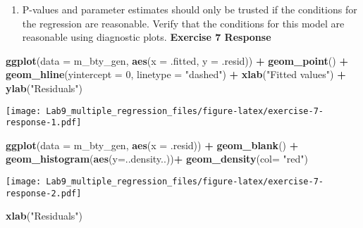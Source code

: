 \documentclass[
]{article}
\newenvironment{Shaded}{\begin{snugshade}}{\end{snugshade}}
\newcommand{\AttributeTok}[1]{\textcolor[rgb]{0.13,0.29,0.53}{#1}}
\newcommand{\DecValTok}[1]{\textcolor[rgb]{0.00,0.00,0.81}{#1}}
\newcommand{\FunctionTok}[1]{\textcolor[rgb]{0.13,0.29,0.53}{\textbf{#1}}}
\newcommand{\NormalTok}[1]{#1}
\newcommand{\SpecialCharTok}[1]{\textcolor[rgb]{0.81,0.36,0.00}{\textbf{#1}}}
\newcommand{\StringTok}[1]{\textcolor[rgb]{0.31,0.60,0.02}{#1}}
\providecommand{\tightlist}{%
  \setlength{\itemsep}{0pt}\setlength{\parskip}{0pt}}
\begin{document}
\begin{enumerate}
\def\labelenumi{\arabic{enumi}.}
\setcounter{enumi}{6}
\tightlist
\item
  P-values and parameter estimates should only be trusted if the
  conditions for the regression are reasonable. Verify that the
  conditions for this model are reasonable using diagnostic plots.
  \textbf{Exercise 7 Response}
\end{enumerate}

\begin{Shaded}
\begin{Highlighting}[]
\FunctionTok{ggplot}\NormalTok{(}\AttributeTok{data =}\NormalTok{ m\_bty\_gen, }\FunctionTok{aes}\NormalTok{(}\AttributeTok{x =}\NormalTok{ .fitted, }\AttributeTok{y =}\NormalTok{ .resid)) }\SpecialCharTok{+}
  \FunctionTok{geom\_point}\NormalTok{() }\SpecialCharTok{+}
  \FunctionTok{geom\_hline}\NormalTok{(}\AttributeTok{yintercept =} \DecValTok{0}\NormalTok{, }\AttributeTok{linetype =} \StringTok{"dashed"}\NormalTok{) }\SpecialCharTok{+}
  \FunctionTok{xlab}\NormalTok{(}\StringTok{"Fitted values"}\NormalTok{) }\SpecialCharTok{+}
  \FunctionTok{ylab}\NormalTok{(}\StringTok{"Residuals"}\NormalTok{)}
\end{Highlighting}
\end{Shaded}

\texttt{[image: Lab9\_multiple\_regression\_files/figure-latex/exercise-7-response-1.pdf]}

\begin{Shaded}
\begin{Highlighting}[]
\FunctionTok{ggplot}\NormalTok{(}\AttributeTok{data =}\NormalTok{ m\_bty\_gen, }\FunctionTok{aes}\NormalTok{(}\AttributeTok{x =}\NormalTok{ .resid)) }\SpecialCharTok{+}
  \FunctionTok{geom\_blank}\NormalTok{() }\SpecialCharTok{+}
  \FunctionTok{geom\_histogram}\NormalTok{(}\FunctionTok{aes}\NormalTok{(}\AttributeTok{y=}\NormalTok{..density..))}\SpecialCharTok{+}
  \FunctionTok{geom\_density}\NormalTok{(}\AttributeTok{col=} \StringTok{"red"}\NormalTok{)}
\end{Highlighting}
\end{Shaded}

\texttt{[image: Lab9\_multiple\_regression\_files/figure-latex/exercise-7-response-2.pdf]}

\begin{Shaded}
\begin{Highlighting}[]
  \FunctionTok{xlab}\NormalTok{(}\StringTok{"Residuals"}\NormalTok{) }
\end{Highlighting}
\end{Shaded}
\end{document}
